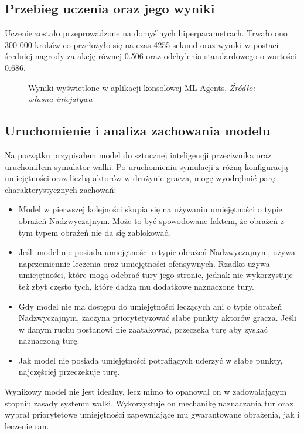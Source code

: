 \documentclass{SGGW-thesis}
\begin{document}
\subsection{Przebieg uczenia oraz jego wyniki}
Uczenie zostało przeprowadzone na domyślnych hiperparametrach. Trwało ono 300 000 kroków co przełożyło się na czas 4255 sekund oraz
wyniki w postaci średniej nagrody za akcję równej 0.506 oraz odchylenia standardowego o wartości 0.686.
\begin{figure}[H]
  \centering
  \noindent{}
  \addtocounter{figure}{9}
  \caption{Wyniki wyświetlone w aplikacji konsolowej ML-Agents, \textit{Źródło: własna inicjatywa}}
\end{figure}
\subsection{Uruchomienie i analiza zachowania modelu}
Na początku przypisałem model do sztucznej inteligencji przeciwnika oraz uruchomiłem symulator walki. Po uruchomieniu symulacji z różną konfiguracją umiejętności oraz liczbą aktorów w drużynie gracza, mogę wyodrębnić parę charakterystycznych zachowań:
\begin{itemize}
  \item Model w pierwszej kolejności skupia się na używaniu umiejętności o typie obrażeń Nadzwyczajnym. Może to być spowodowane faktem, że obrażeń z tym typem obrażeń nie da się zablokować,
  \item Jeśli model nie posiada umiejętności o typie obrażeń Nadzwyczajnym, używa naprzemiennie leczenia oraz umiejętności ofensywnych. Rzadko używa umiejętności, które mogą odebrać tury jego stronie, jednak nie wykorzystuje też zbyt często tych, które dadzą mu dodatkowe naznaczone tury.
  \item Gdy model nie ma dostępu do umiejętności leczących ani o typie obrażeń Nadzwyczajnym, zaczyna priorytetyzować słabe punkty aktorów gracza. Jeśli w danym ruchu postanowi nie zaatakować, przeczeka turę aby zyskać naznaczoną turę.
  \item Jak model nie posiada umiejętności potrafiących uderzyć w słabe punkty, najczęściej przeczekuje turę.  
\end{itemize}
\pagebreak
Wynikowy model nie jest idealny, lecz mimo to opanował on w zadowalającym stopniu zasady systemu walki. Wykorzystuje on mechanikę naznaczania tur oraz wybrał priorytetowe umiejętności zapewniające mu gwarantowane obrażenia, jak i leczenie ran.
\end{document}
